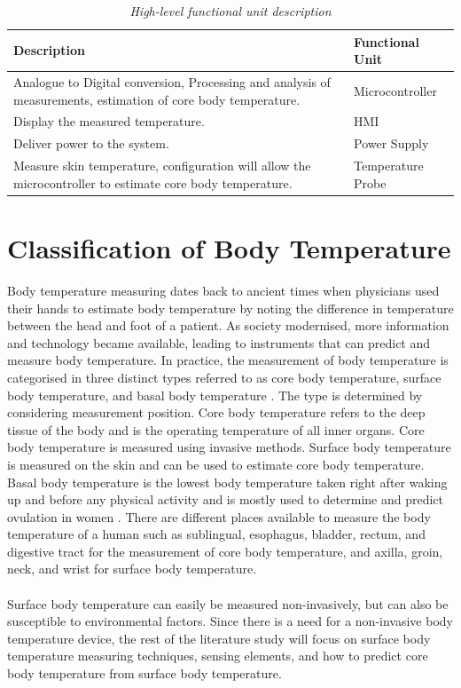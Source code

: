 \begin{table}[H]
	\centering
	\caption{\textit{High-level functional unit description}}
	\label{tab:3}
	\begin{tabular}{|p{8cm}|p{4cm}|}
		\hline
		\textbf{Description} & \textbf{Functional Unit}\\
		\hline
		Analogue to Digital conversion, Processing and analysis of measurements, estimation of core body temperature. & Microcontroller\\
		\hline
		Display the measured temperature. & HMI\\
		\hline
		Deliver power to the system. & Power Supply\\
		\hline
		Measure skin temperature, configuration will allow the microcontroller to estimate core body temperature. & Temperature Probe\\
		\hline
	\end{tabular}
\end{table}

\section{Classification of Body Temperature}
Body temperature measuring dates back to ancient times when physicians used their hands to estimate body temperature by noting the difference in temperature between the head and foot of a patient. As society modernised, more information and technology became available, leading to instruments that can predict and measure body temperature. In practice, the measurement of body temperature is categorised in three distinct types referred to as core body temperature, surface body temperature, and basal body temperature \cite{Chen2019}. The type is determined by considering measurement position. Core body temperature refers to the deep tissue of the body and is the operating temperature of all inner organs. Core body temperature is measured using invasive methods. Surface body temperature is measured on the skin and can be used to estimate core body temperature. Basal body temperature is the lowest body temperature taken right after waking up and before any physical activity and is mostly used to determine and predict ovulation in women \cite{Basal}. There are different places available to measure the body temperature of a human such as sublingual, esophagus, bladder, rectum, and digestive tract for the measurement of core body temperature, and axilla, groin, neck, and wrist for surface body temperature. \\\\
Surface body temperature can easily be measured non-invasively, but can also be susceptible to environmental factors. Since there is a need for a non-invasive body temperature device, the rest of the literature study will focus on surface body temperature measuring techniques, sensing elements, and how to predict core body temperature from surface body temperature. 

